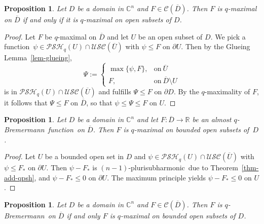 \documentclass[reqno]{amsart}
\newtheorem{prop}[thm]{Proposition}
\theoremstyle{definition}
\numberwithin{equation}{section}
\newcommand{\cbb}{\mathbb{C}}
\newcommand{\rbb}{\mathbb{R}}
\newcommand{\ccal}{\mathcal{C}}
\newcommand{\USC}{\mathcal{USC}}
\newcommand{\qbrem}{$q$-Bremermann}
\newcommand{\psh}{pluri\-sub\-harmonic}
\newcommand{\PSH}{\mathcal{PSH}}
\newcommand{\cl}[1]{\overline{#1}}
\newcommand{\fct}{function}
\newcommand{\cld}{\overline{D}}
\begin{document}
\begin{prop}\label{prop-equiv-glob-loc-q-max} Let $D$ be a domain in $\cbb^n$ and $F\in\ccal(\cld)$. Then $F$ is $q$-maximal on $\cld$ if and only if it is $q$-maximal on open subsets of $D$.
\end{prop}

\begin{proof} Let $F$ be $q$-maximal on $\cld$ and let $U$ be an open subset of $D$. We pick a \fct\ $\psi \in \PSH_q(U)\cap \USC(\cl{U})$ with $\psi \leq F$ on $\partial U$. Then by the Glueing Lemma~\ref{lem-glueing},
\[
\Psi := \begin{cases} \max\{\psi,F\}, & \text{on}\ \cl{U}\\ F, & \text{on}\ \cld\setminus U \end{cases}
\]
is in $\PSH_q(U)\cap \USC(\cl{U})$ and fulfills $\Psi \leq F$ on $\partial D$. By the $q$-maximality of $F$, it follows that $\Psi\leq F$ on $\cld$, so that $\psi\leq\Psi \leq F$ on $U$.
\end{proof}


\begin{prop}\label{prop-a-q-brem-implies-loc-q-max} Let $D$ be a domain in $\cbb^n$ and let $F:\cld\to\rbb$ be an almost \qbrem\ \fct\ on $\cld$. Then $F$ is $q$-maximal on bounded open subsets of~$D$.
\end{prop}

\begin{proof} Let $U$ be a bounded open set in $D$ and $\psi \in \PSH_q(U)\cap\USC(\cl{U})$ with $\psi \leq F_*$ on $\partial U$. Then $\psi-F_*$ is $(n-1)$-\psh\ due to Theorem~\ref{thm-add-qpsh}, and $\psi-F_* \leq 0$ on $\partial U$. The maximum principle yields $\psi-F_*\leq 0$ on $U$. 
\end{proof}


\begin{prop}\label{prop-equiv-loc-q-max-2} Let $D$ be a domain in $\cbb^n$ and $F\in\ccal(\cld)$. Then $F$ is \qbrem\ on $\cld$ if and only $F$ is $q$-maximal on bounded open subsets of $D$.
\end{prop}
\end{document}
